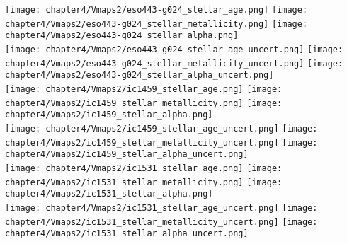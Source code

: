 \begin{figure*}
	\centering
	\texttt{[image: chapter4/Vmaps2/eso443-g024\_stellar\_age.png]}
	\texttt{[image: chapter4/Vmaps2/eso443-g024\_stellar\_metallicity.png]}
	\texttt{[image: chapter4/Vmaps2/eso443-g024\_stellar\_alpha.png]}
	\\
	\texttt{[image: chapter4/Vmaps2/eso443-g024\_stellar\_age\_uncert.png]}
	\texttt{[image: chapter4/Vmaps2/eso443-g024\_stellar\_metallicity\_uncert.png]}
	\texttt{[image: chapter4/Vmaps2/eso443-g024\_stellar\_alpha\_uncert.png]}
	\\
	\texttt{[image: chapter4/Vmaps2/ic1459\_stellar\_age.png]}
	\texttt{[image: chapter4/Vmaps2/ic1459\_stellar\_metallicity.png]}
	\texttt{[image: chapter4/Vmaps2/ic1459\_stellar\_alpha.png]}
	\\
	\texttt{[image: chapter4/Vmaps2/ic1459\_stellar\_age\_uncert.png]}
	\texttt{[image: chapter4/Vmaps2/ic1459\_stellar\_metallicity\_uncert.png]}
	\texttt{[image: chapter4/Vmaps2/ic1459\_stellar\_alpha\_uncert.png]}
	\\
	\texttt{[image: chapter4/Vmaps2/ic1531\_stellar\_age.png]}
	\texttt{[image: chapter4/Vmaps2/ic1531\_stellar\_metallicity.png]}
	\texttt{[image: chapter4/Vmaps2/ic1531\_stellar\_alpha.png]}
	\\
	\texttt{[image: chapter4/Vmaps2/ic1531\_stellar\_age\_uncert.png]}
	\texttt{[image: chapter4/Vmaps2/ic1531\_stellar\_metallicity\_uncert.png]}
	\texttt{[image: chapter4/Vmaps2/ic1531\_stellar\_alpha\_uncert.png]}
	\\
	\caption[VIMOS stellar population maps]{VIMOS stellar population maps: From left to right: age, metallicity and alpha enhancement, Top to bottom ESO443-G024, IC1459 and IC1531. Rows show parameter and uncertainty in the parameter on alternate rows. Plots are as in figure \ref{fig:VIMOS_stellar}}
	\label{fig:VIMOS_stellar}
\end{figure*}

